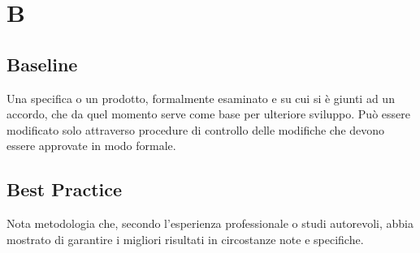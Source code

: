 \section*{B}

\subsection{Baseline}
Una specifica o un prodotto, formalmente esaminato e su cui si è giunti ad un accordo, che da quel momento serve come base per ulteriore sviluppo. Può essere modificato solo attraverso procedure di controllo delle modifiche che devono essere approvate in modo formale.

\subsection{Best Practice}
Nota metodologia che, secondo l'esperienza professionale o studi autorevoli, abbia mostrato di garantire i migliori risultati in circostanze note e specifiche.